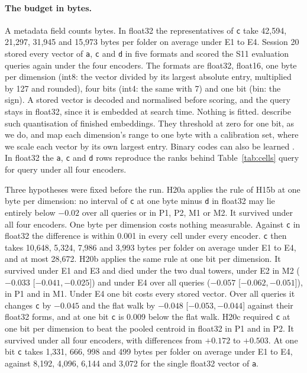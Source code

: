 \documentclass[11pt]{article}
\newcommand{\rep}[1]{\texttt{#1}}
\newcommand{\ci}[2]{[\ensuremath{#1},\,\ensuremath{#2}]}  %
\begin{document}
\paragraph{The budget in bytes.} A metadata field counts bytes. In float32 the representatives of \rep{c} take 42,594, 21,297, 31,945 and 15,973 bytes per folder on average under E1 to E4. Session 20 stored every vector of \rep{a}, \rep{c} and \rep{d} in five formats and scored the S11 evaluation queries again under the four encoders. The formats are float32, float16, one byte per dimension (int8: the vector divided by its largest absolute entry, multiplied by 127 and rounded), four bits (int4: the same with 7) and one bit (bin: the sign). A stored vector is decoded and normalised before scoring, and the query stays in float32, since it is embedded at search time. Nothing is fitted. \citet{shakir2024quantization} describe such quantisation of finished embeddings. They threshold at zero for one bit, as we do, and map each dimension's range to one byte with a calibration set, where we scale each vector by its own largest entry. Binary codes can also be learned \citep{yamada2021bpr}. In float32 the \rep{a}, \rep{c} and \rep{d} rows reproduce the ranks behind Table~\ref{tab:cells} query for query under all four encoders.

Three hypotheses were fixed before the run. H20a applies the rule of H15b at one byte per dimension: no interval of \rep{c} at one byte minus \rep{d} in float32 may lie entirely below $-0.02$ over all queries or in P1, P2, M1 or M2. It survived under all four encoders. One byte per dimension costs nothing measurable. Against \rep{c} in float32 the difference is within 0.001 in every cell under every encoder. \rep{c} then takes 10,648, 5,324, 7,986 and 3,993 bytes per folder on average under E1 to E4, and at most 28,672. H20b applies the same rule at one bit per dimension. It survived under E1 and E3 and died under the two dual towers, under E2 in M2 ($-0.033$ \ci{-0.041}{-0.025}) and under E4 over all queries ($-0.057$ \ci{-0.062}{-0.051}), in P1 and in M1. Under E4 one bit costs every stored vector. Over all queries it changes \rep{c} by $-0.045$ and the flat walk by $-0.048$ \ci{-0.053}{-0.044} against their float32 forms, and at one bit \rep{c} is 0.009 below the flat walk. H20c required \rep{c} at one bit per dimension to beat the pooled centroid in float32 in P1 and in P2. It survived under all four encoders, with differences from $+0.172$ to $+0.503$. At one bit \rep{c} takes 1,331, 666, 998 and 499 bytes per folder on average under E1 to E4, against 8,192, 4,096, 6,144 and 3,072 for the single float32 vector of \rep{a}.
\end{document}
